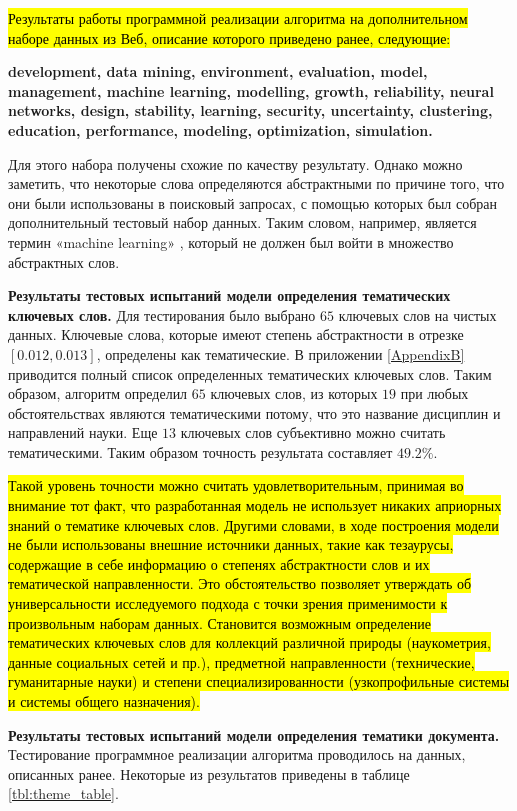 \hl{Результаты работы программной реализации алгоритма на дополнительном наборе данных из Веб, описание которого приведено ранее, следующие:}

\textbf{development, data mining, environment, evaluation, model, management, machine learning, modelling, growth, reliability, neural networks, design, stability, learning, security, uncertainty, clustering, education, performance, modeling, optimization, simulation.}

Для этого набора получены схожие по качеству результату. Однако можно заметить, что некоторые слова определяются абстрактными по причине того, что они были использованы в поисковый запросах, с помощью которых был собран дополнительный тестовый набор данных. Таким словом, например, является термин «machine learning» , который не должен был войти в множество абстрактных слов.

\textbf{Результаты тестовых испытаний модели определения тематических ключевых слов.}
Для тестирования было выбрано $65$ ключевых слов на чистых данных. Ключевые слова, которые имеют степень абстрактности в отрезке $[0.012, 0.013]$, определены как тематические. В приложении \ref{AppendixB} приводится полный список определенных тематических ключевых слов. Таким образом, алгоритм определил $65$ ключевых слов, из которых $19$ при любых обстоятельствах являются тематическими потому, что это название дисциплин и направлений науки. Еще $13$ ключевых слов субъективно можно считать тематическими. Таким образом точность результата составляет $49.2\%$.

\hl{Такой уровень точности можно считать удовлетворительным, принимая во внимание тот факт, что разработанная модель не использует никаких априорных знаний о тематике ключевых слов. Другими словами, в ходе построения модели не были использованы внешние источники данных, такие как тезаурусы, содержащие в себе информацию о степенях абстрактности слов и их тематической направленности. Это обстоятельство позволяет утверждать об универсальности исследуемого подхода с точки зрения применимости к произвольным наборам данных. Становится возможным определение тематических ключевых слов для коллекций различной природы (наукометрия, данные социальных сетей и пр.), предметной направленности (технические, гуманитарные науки) и степени специализированности (узкопрофильные системы и системы общего назначения).}


\textbf{Результаты тестовых испытаний модели определения тематики документа.}
Тестирование программное реализации алгоритма проводилось на данных, описанных ранее. Некоторые из результатов приведены в таблице \ref{tbl:theme_table}.

